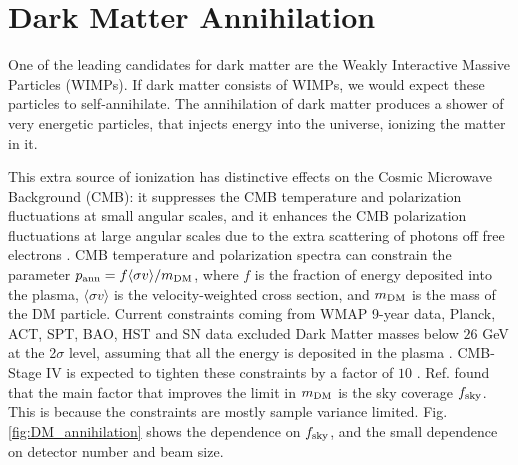 \begin{quotation}


\end{quotation}

\section{Dark Matter Annihilation}

One of the leading candidates for dark matter are the Weakly Interactive Massive Particles (WIMPs). If dark matter consists of WIMPs, we would expect these particles to self-annihilate. The annihilation of dark matter produces a shower of very energetic particles, that injects energy into the universe, ionizing the matter in it.

This extra source of ionization has distinctive effects on the Cosmic Microwave Background (CMB): it suppresses the CMB temperature and polarization fluctuations at small angular scales, and it enhances the CMB polarization fluctuations at large angular scales due to the extra scattering of photons off free electrons \cite{Chen:2003gz,Padmanabhan:2005es}.
CMB temperature and polarization spectra can constrain the parameter
$p_{\rm ann}=f\langle\sigma v\rangle/m_{\rm DM}$, where $f$ is the fraction of energy
deposited into the plasma, $\langle\sigma v\rangle$ is the velocity-weighted
cross section, and $m_{\rm DM}$ is the mass of the DM particle.
Current constraints coming from WMAP 9-year data,
Planck, ACT, SPT, BAO, HST and SN data excluded
Dark Matter masses below $26$ GeV at the 2$\sigma$ level, assuming that
all the energy is deposited in the plasma \cite{Madhavacheril:2013cna}. CMB-Stage IV is expected to tighten these constraints by a factor of $10$ \cite{Wu:2014hta}. 
Ref. \cite{Wu:2014hta} found that the main factor that improves the limit in $m_{\rm DM}$ is the sky coverage $f_{\rm sky}$. This is because the constraints are mostly sample variance limited. Fig. \ref{fig:DM_annihilation} shows the dependence on $f_{\rm sky}$, and the small dependence on detector number and beam size.

